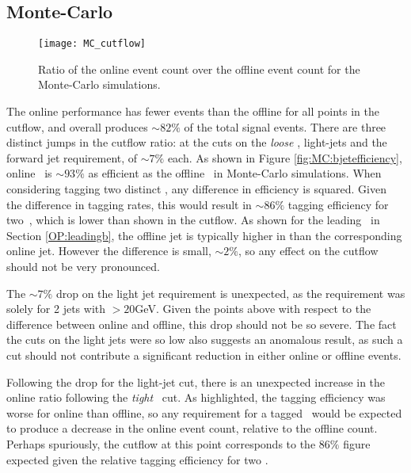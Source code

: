     \subsection{Monte-Carlo}
        \begin{figure}[h]
            \centering
            \texttt{[image: MC\_cutflow]}
            \caption[\VBFHBB\ Cutflow ratio for Monte-Carlo simulation]{Ratio of the online event count over the offline event count for the Monte-Carlo simulations.}
            \label{f:cutflowMC}
        \end{figure}

    The online performance has fewer events than the offline for all points in the cutflow, and overall produces $\sim82\%$ of the total signal events. There are three distinct jumps in the cutflow ratio: at the cuts on the \textit{loose} \bjets, light-jets and the forward jet requirement, of $\sim7\%$ each. As shown in Figure \ref{fig:MC:bjetefficiency}, online \btag\, is $\sim93\%$ as efficient as the offline \btag\ in Monte-Carlo simulations. When considering tagging two distinct \bjets, any difference in efficiency is squared. Given the difference in tagging rates, this would result in $\sim86\%$ tagging efficiency for two \bjets\,, which is lower than shown in the cutflow. As shown for the leading \bjet\ in Section \ref{OP:leadingb}, the offline jet is typically higher in \pt than the corresponding online jet. However the difference is small, $\sim2\%$, so any effect on the cutflow should not be very pronounced.

    The $\sim7\%$ drop on the light jet requirement is unexpected, as the requirement was solely for 2 jets with \pt$>20$GeV. Given the points above with respect to the \pt difference between online and offline, this drop should not be so severe. The fact the \pt cuts on the light jets were so low also suggests an anomalous result, as such a cut should not contribute a significant reduction in either online or offline events.

    Following the drop for the light-jet cut, there is an unexpected increase in the online ratio following the \textit{tight} \btagging\, cut. As highlighted, the tagging efficiency was worse for online than offline, so any requirement for a tagged \bjet\, would be expected to produce a decrease in the online event count, relative to the offline count. Perhaps spuriously, the cutflow at this point corresponds to the $86\%$ figure expected given the relative tagging efficiency for two \bjets.

